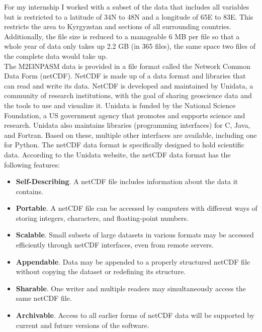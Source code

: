 \documentclass[../00_main.tex]{subfiles}
\begin{document}
For my internship I worked with a subset of the data that includes all
variables but is restricted to a latitude of 34\textdegree{}N to
48\textdegree{}N and a longitude of 65\textdegree{}E to 83\textdegree{}E. This
restricts the area to Kyrgyzstan and sections of all surrounding countries.
Additionally, the file size is reduced to a manageable 6 MB per file so that
a whole year of data only takes up 2.2 GB (in 365 files), the same space two
files of the complete data would take up.\\
The M2I3NPASM data is provided in a file format called the Network Common Data 
Form 
(netCDF). NetCDF is made up of a data format and libraries that can read and
write its data. 
NetCDF is developed and maintained by Unidata, a community of
research institutions, with the goal of sharing geoscience data and the tools
to use and visualize it. 
Unidata is funded by the National Science Foundation,
a US government agency that promotes and supports science and research.
Unidata also maintains libraries (programming interfaces) for C, Java, and
Fortran. Based on these, multiple other interfaces are available, including one
for Python.\newline
The netCDF data format is specifically designed to hold scientific data.
According to the Unidata website, the netCDF data format has the following
features:
\begin{itemize}
    \item \textbf{Self-Describing}. A netCDF file includes information about 
        the data it contains.
    \item \textbf{Portable}. A netCDF file can be accessed by computers with 
        different ways of storing integers, characters, and floating-point 
        numbers.
    \item \textbf{Scalable}. Small subsets of large datasets in various formats 
        may be accessed efficiently through netCDF interfaces, even from remote 
        servers.
    \item \textbf{Appendable}. Data may be appended to a properly structured 
        netCDF file without copying the dataset or redefining its structure.
    \item \textbf{Sharable}. One writer and multiple readers may simultaneously 
        access the same netCDF file.
    \item \textbf{Archivable}. Access to all earlier forms of netCDF data will 
        be supported by current and future versions of the software.
\end{itemize}
\end{document}
